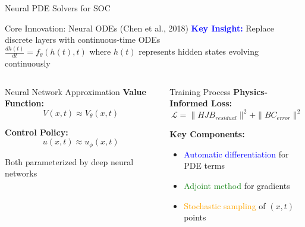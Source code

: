 \documentclass[aspectratio=169,xcolor=dvipsnames]{beamer}
\begin{document}
\begin{frame}{Neural PDE Solvers for SOC}
    
    \begin{block}{Core Innovation: Neural ODEs (Chen et al., 2018)}
        \textcolor{blue}{\textbf{Key Insight:}} Replace discrete layers with continuous-time ODEs \\
        $\frac{dh(t)}{dt} = f_\theta(h(t), t)$ where $h(t)$ represents hidden states evolving continuously
    \end{block}

    \vspace{-0.3cm}

    \begin{columns}[t]
        \begin{alertblock}{Neural Network Approximation}
            \small
            \textbf{Value Function:}
            \begin{equation}
            V(x,t) \approx V_\theta(x,t)
            \end{equation}
            
            \textbf{Control Policy:}
            \begin{equation}
            u(x,t) \approx u_\phi(x,t)
            \end{equation}
            
            Both parameterized by deep neural networks
        \end{alertblock}
        
        \begin{block}{Training Process}
            \small
            \textbf{Physics-Informed Loss:}
            \begin{equation}
            \mathcal{L} = \|HJB_{residual}\|^2 + \|BC_{error}\|^2
            \end{equation}
            
            \textbf{Key Components:}
            \begin{itemize}
                \item \textcolor{blue}{Automatic differentiation} for PDE terms
                \item \textcolor{ForestGreen}{Adjoint method} for gradients
                \item \textcolor{orange}{Stochastic sampling} of $(x,t)$ points
            \end{itemize}
        \end{block}
    \end{columns}
    

\end{frame}
\end{document}

